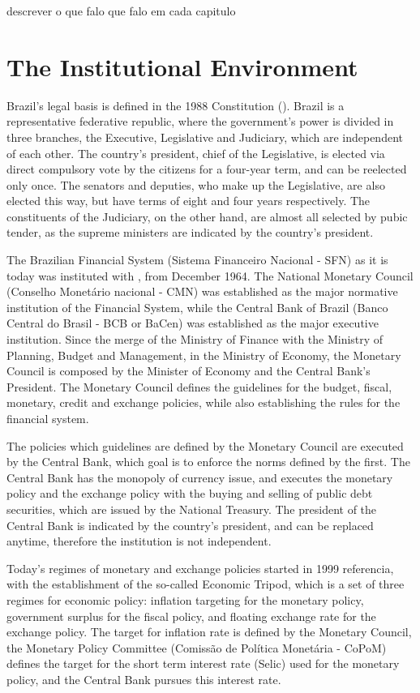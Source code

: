 \documentclass[cic,tc, english]{iiufrgs}
\begin{document}
    {descrever o que falo que falo em cada capitulo}


\chapter{The Institutional Environment} \label{chapter_institutional}

    Brazil's legal basis is defined in the 1988 Constitution (\citet{constituicao}). Brazil is a representative federative republic, where the government's power is divided in three branches, the Executive, Legislative and Judiciary, which are independent of each other. The country's president, chief of the Legislative, is elected via direct compulsory vote by the citizens for a four-year term, and can be reelected only once. The senators and deputies, who make up the Legislative, are also elected this way, but have terms of eight and four years respectively. The constituents of the Judiciary, on the other hand, are almost all selected by pubic tender, as the supreme ministers are indicated by the country's president.

    The Brazilian Financial System (Sistema Financeiro Nacional - SFN) as it is today was instituted with \citet{lei4595}, from December 1964. The National Monetary Council (Conselho Monetário nacional - CMN) was established as the major normative institution of the Financial System, while the Central Bank of Brazil (Banco Central do Brasil - BCB or BaCen) was established as the major executive institution. Since the merge of the Ministry of Finance with the Ministry of Planning, Budget and Management, in the Ministry of Economy, the Monetary Council is composed by the Minister of Economy and the Central Bank's President. The Monetary Council defines the guidelines for the budget, fiscal, monetary, credit and exchange policies, while also establishing the rules for the financial system.

    The policies which guidelines are defined by the Monetary Council are executed by the Central Bank, which goal is to enforce the norms defined by the first. The Central Bank has the monopoly of currency issue, and executes the monetary policy and the exchange policy with the buying and selling of public debt securities, which are issued by the National Treasury. The president of the Central Bank is indicated by the country's president, and can be replaced anytime, therefore the institution is not independent.

    Today's regimes of monetary and exchange policies started in 1999 {referencia}, with the establishment of the so-called Economic Tripod, which is a set of three regimes for economic policy: inflation targeting for the monetary policy, government surplus for the fiscal policy, and floating exchange rate for the exchange policy. The target for inflation rate is defined by the Monetary Council, the Monetary Policy Committee (Comissão de Política Monetária - CoPoM) defines the target for the short term interest rate (Selic) used for the monetary policy, and the Central Bank pursues this interest rate.
\end{document}

